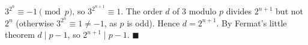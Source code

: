 $3^{2^n}\equiv-1\pmod p$, so $3^{2^{n+1}}\equiv1$. The order $d$ of $3$ modulo $p$ divides $2^{n+1}$ but not $2^n$ (otherwise $3^{2^n}\equiv1\ne-1$, as $p$ is odd). Hence $d=2^{n+1}$. By Fermat's little theorem $d\mid p-1$, so $2^{n+1}\mid p-1$. $\blacksquare$
